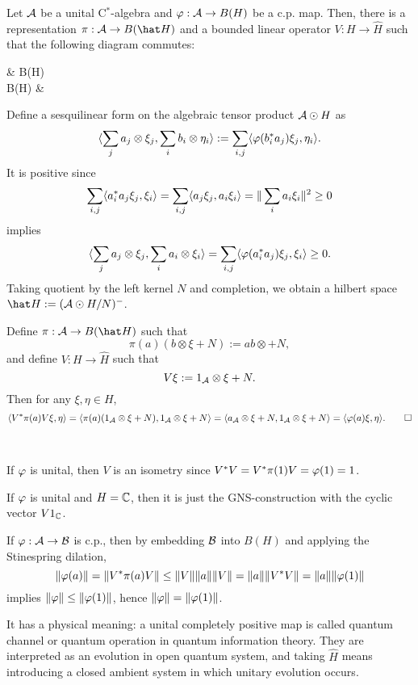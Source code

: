 \documentclass{../../small}
\begin{document}
\begin{thm}
Let $\mathcal{A}$ be a unital C$^*$-algebra and $\varphi:\mathcal{A}\to B(H)$ be a c.p. map.
Then, there is a representation $\pi:\cA\to B(\hat H)$ and a bounded linear operator $V:H\to\hat H$ such that the following diagram commutes:
\begin{cd}
\cA {}  & B(H) \\
B(\hat H)  &
\end{cd}
\end{thm}
\begin{pf}
Define a sesquilinear form on the algebraic tensor product $\mathcal{A}\odot H$ as
\[\langle\sum_ja_j\otimes\xi_j,\sum_ib_i\otimes\eta_i\rangle:=\sum_{i,j}\langle\varphi(b_i^*a_j)\xi_j,\eta_i\rangle.\]
It is positive since
\[\sum_{i,j}\langle a_i^*a_j\xi_j,\xi_i\rangle=\sum_{i,j}\langle a_j\xi_j,a_i\xi_i\rangle=\|\sum_ia_i\xi_i\|^2\ge0\]
implies
\[\langle\sum_ja_j\otimes\xi_j,\sum_ia_i\otimes\xi_i\rangle=\sum_{i,j}\langle\varphi(a_i^*a_j)\xi_j,\xi_i\rangle\ge0.\]
Taking quotient by the left kernel $N$ and completion, we obtain a hilbert space $\hat H:=(\cA\odot H/N)^-$.

Define $\pi:\cA\to B(\hat H)$ such that
\[\pi(a)(b\otimes\xi+N):=ab\otimes+N,\]
and define $V:H\to\hat H$ such that
\[V\xi:=1_{\mathcal{A}}\otimes\xi+N.\]
Then for any $\xi,\eta\in H$,
\[\langle V^*\pi(a)V\xi,\eta\rangle=\langle\pi(a)(1_{\mathcal{A}}\otimes\xi+N),1_{\mathcal{A}}\otimes\xi+N\rangle=\langle a_{\mathcal{A}}\otimes\xi+N,1_{\mathcal{A}}\otimes\xi+N\rangle=\langle\varphi(a)\xi,\eta\rangle.\qedhere\]
\end{pf}

\begin{rmk}\,
\begin{parts}
\item If $\varphi$ is unital, then $V$ is an isometry since $V^*V=V^*\pi(1)V=\varphi(1)=1$.
\item If $\varphi$ is unital and $H=\mathbb{C}$, then it is just the GNS-construction with the cyclic vector $V1_{\mathbb{C}}$.
\item If $\varphi:\mathcal{A}\to\mathcal{B}$ is c.p., then by embedding $\mathcal{B}$ into $B(H)$ and applying the Stinespring dilation,
\[\|\varphi(a)\|=\|V^*\pi(a)V\|\le\|V\|\|a\|\|V\|=\|a\|\|V^*V\|=\|a\|\|\varphi(1)\|\]
implies $\|\varphi\|\le\|\varphi(1)\|$, hence $\|\varphi\|=\|\varphi(1)\|$.
\item It has a physical meaning: a unital completely positive map is called quantum channel or quantum operation in quantum information theory. They are interpreted as an evolution in open quantum system, and taking $\hat H$ means introducing a closed ambient system in which unitary evolution occurs.
\end{parts}
\end{rmk}
\end{document}
